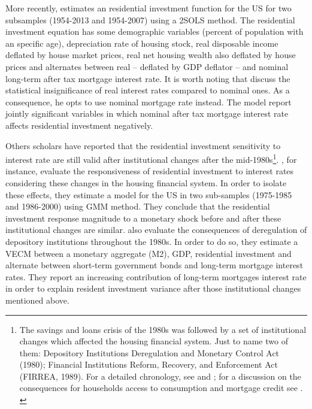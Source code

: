 \documentclass[12pt, a4paper]{article}
\begin{document}
More recently, \textcite{fair_macroeconometric_2018} estimates an residential investment function for the US for two subsamples (1954-2013 and 1954-2007) using a 2SOLS method.
The residential investment equation has some demographic variables (percent of population with an specific age), depreciation rate of housing stock, real disposable income deflated by house market prices, real net housing wealth also deflated by house prices and alternates between real -- deflated by GDP deflator -- and nominal long-term after tax mortgage interest rate.
It is worth noting that \textcite{fair_macroeconometric_2018} discuss the statistical insignificance of real interest rates compared to nominal ones.
As a consequence, he opts to use nominal mortgage rate instead.
The model report jointly significant variables in which nominal after tax mortgage interest rate affects residential investment negatively.

Others scholars have reported that the residential investment sensitivity to interest rate are still valid after institutional changes after the mid-1980s\footnote{The savings and loans crisis of the 1980s was followed by a set of institutional changes which affected the housing financial system. Just to name two of them: Depository Institutions Deregulation and Monetary Control Act (1980); Financial Institutions Reform, Recovery, and Enforcement Act (FIRREA, 1989). For a detailed chronology, see  \textcite[Appendix B]{mccarthyMonetaryPolicyTransmission2002} and \textcite{green_american_2005}; for a discussion on the consequences for households access to consumption and mortgage credit see \textcite{federal_deposit_insurance_corporation_savings_1997,wall_too_2010}. \label{nota_instituicoes}}.
\textcite{mccarthyMonetaryPolicyTransmission2002}, for instance, evaluate the responsiveness of residential investment to interest rates considering these changes in the housing financial system.
In order to isolate these effects, they estimate  a model for the US in two sub-samples (1975-1985 and 1986-2000) using GMM method.
They conclude that the residential investment response magnitude to a monetary shock before and after these institutional changes are similar.
\textcite{gauger_residential_2003} also evaluate the consequences of deregulation of depository institutions throughout the 1980s.
In order to do so, they estimate a VECM between a monetary aggregate (M2), GDP, residential investment and alternate between short-term government bonds and long-term mortgage interest rates.
They report an increasing contribution of long-term mortgages interest rate in order to explain resident investment variance after those institutional changes mentioned above.
\end{document}
